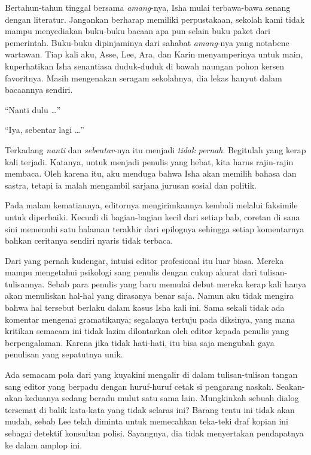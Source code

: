 \documentclass[smalldemyvopaper,11pt,twoside,onecolumn,openright,extrafontsizes]{memoir}
\begin{document}


Bertahun-tahun tinggal bersama \textit{amang}-nya, Isha mulai terbawa-bawa senang dengan literatur. Jangankan berharap memiliki perpustakaan, sekolah kami tidak mampu menyediakan buku-buku bacaan apa pun selain buku paket dari pemerintah. Buku-buku dipinjaminya dari sahabat \textit{amang}-nya yang notabene wartawan. Tiap kali aku, Asse, Lee, Ara, dan Karin menyamperinya untuk main, kuperhatikan Isha senantiasa duduk-duduk di bawah naungan pohon kersen favoritnya. Masih mengenakan seragam sekolahnya, dia lekas hanyut dalam bacaannya sendiri.

``Nanti dulu \dots''

``Iya, sebentar lagi \dots''

Terkadang \textit{nanti} dan \textit{sebentar}-nya itu menjadi \textit{tidak pernah}. Begitulah yang kerap kali terjadi. Katanya, untuk menjadi penulis yang hebat, kita harus rajin-rajin membaca. Oleh karena itu, aku menduga bahwa Isha akan memilih bahasa dan sastra, tetapi ia malah mengambil sarjana jurusan sosial dan politik.

Pada malam kematiannya, editornya mengirimkannya kembali melalui faksimile untuk diperbaiki. Kecuali di bagian-bagian kecil dari setiap bab, coretan di sana sini memenuhi satu halaman terakhir dari epilognya sehingga setiap komentarnya bahkan ceritanya sendiri nyaris tidak terbaca. %

Dari yang pernah kudengar, intuisi editor profesional itu luar biasa. Mereka mampu mengetahui psikologi sang penulis dengan cukup akurat dari tulisan-tulisannya. Sebab para penulis yang baru memulai debut mereka kerap kali hanya akan menuliskan hal-hal yang dirasanya benar saja. Namun aku tidak mengira bahwa hal tersebut berlaku dalam kasus Isha kali ini. Sama sekali tidak ada komentar mengenai gramatikanya; segalanya tertuju pada diksinya, yang mana kritikan semacam ini tidak lazim dilontarkan oleh editor kepada penulis yang berpengalaman. Karena jika tidak hati-hati, itu bisa saja mengubah gaya penulisan yang sepatutnya unik.


Ada semacam pola dari yang kuyakini mengalir di dalam tulisan-tulisan tangan sang editor yang berpadu dengan huruf-huruf cetak si pengarang naskah. Seakan-akan keduanya sedang beradu mulut satu sama lain. Mungkinkah sebuah dialog tersemat di balik kata-kata yang tidak selaras ini? Barang tentu ini tidak akan mudah, sebab Lee telah diminta untuk memecahkan teka-teki draf kopian ini sebagai detektif konsultan polisi. Sayangnya, dia tidak menyertakan pendapatnya ke dalam amplop ini.
\end{document}
